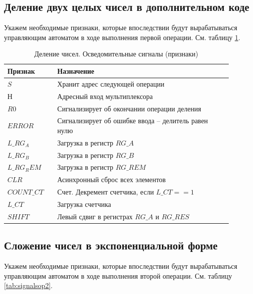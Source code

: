 \documentclass[a4paper,14pt]{extarticle}
\begin{document}
\subsection{Деление двух целых чисел в дополнительном коде}
Укажем необходимые признаки, которые впоследствии будут вырабатываться управляющим автоматом в ходе выполнения первой операции. См. таблицу \ref{tab:signalsop1}.
\begin{table}[h!]
	\small
	\centering
	\begin{tabular}{|m{0.2\linewidth}|m{0.7\linewidth}|}
		\hline
		\textbf{Признак} & \textbf{Назначение} \\ \hline
		$S$ & Хранит адрес следующей операции \\ \hline
		$Н$ & Адресный вход мультиплексора \\ \hline
		$R0$ & Сигнализирует об окончании операции деления \\ \hline
		$ERROR$ & Сигнализирует об ошибке ввода -- делитель равен нулю \\ \hline
		$L\_RG_A$ & Загрузка в регистр $RG\_A$ \\ \hline
		$L\_RG_B$ & Загрузка в регистр $RG\_B$ \\ \hline
		$L\_RG_REM$ & Загрузка в регистр $RG\_REM$ \\ \hline
		$CLR$ & Асинхронный сброс всех элементов \\ \hline
		$COUNT\_CT$ & Счет. Декремент счетчика, если $L\_CT==1$ \\ \hline
		$L\_CT$ & Загрузка счетчика \\ \hline
		$SHIFT$ & Левый сдвиг в регистрах $RG\_A \text{ и } RG\_RES$ \\ \hline
	\end{tabular}
	\caption{Деление чисел. Осведомительные сигналы (признаки)}
	\label{tab:signalsop1}
\end{table}

	

\subsection{Сложение чисел в экспоненциальной форме}

Укажем необходимые признаки, которые впоследствии будут вырабатываться управляющим автоматом в ходе выполнения второй операции. См. таблицу \ref{tab:signalsop2}.
\end{document}
